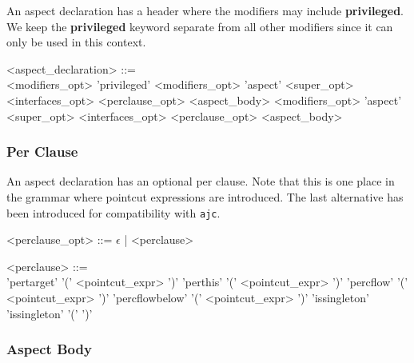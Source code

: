 An aspect declaration has a header where the modifiers may include
{\bf privileged}.   We keep the {\bf privileged} keyword
separate from all other modifiers since it can only be used in this
context.   

\begin{minipage}{6in}
\begin{grammar}
\begin{blue}
<aspect_declaration> ::= \hspace{1in} \\
        {\red <modifiers_opt>} 'privileged' {\red <modifiers_opt>} 'aspect' {} 
          {\red <super_opt> <interfaces_opt>} <perclause_opt> <aspect_body>
\alt
        {\red <modifiers_opt>} 'aspect' {}
        {\red<super_opt> <interfaces_opt>} <perclause_opt> <aspect_body>
\end{blue}
\end{grammar}
\end{minipage}

\subsubsection{Per Clause}

An aspect declaration has an optional per clause.  Note that this is
one place in the grammar where pointcut expressions are introduced.
The last alternative has been introduced for compatibility with
{\tt ajc}.

\begin{minipage}{6in}
\begin{blue}
\begin{grammar}
<perclause_opt> ::= $\epsilon$ |  <perclause> 

<perclause> ::= \hspace{1in} \\ 
                'pertarget' '(' {\blue <pointcut_expr>} ')'
         \alt   'perthis' '(' {\blue <pointcut_expr>} ')'
         \alt   'percflow' '(' {\blue <pointcut_expr>} ')'
         \alt   'percflowbelow' '(' {\blue <pointcut_expr>} ')'
         \alt   'issingleton'  
         \alt   'issingleton' '(' ')'
\end{grammar}
\end{blue}
\end{minipage}

\subsubsection{Aspect Body}

